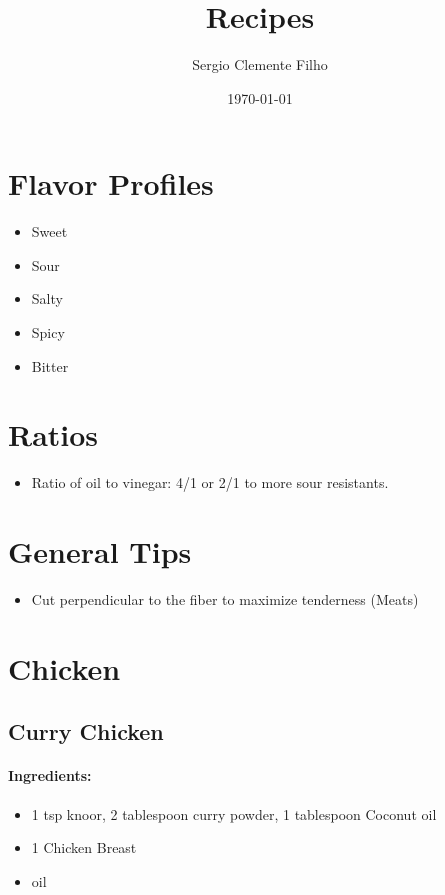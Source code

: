 \documentclass{article}
\title{Recipes}
\author{Sergio Clemente Filho}
\date{\today}
\begin{document}
\maketitle

\newpage

\tableofcontents{}

\newpage

\section{Flavor Profiles}
\begin{itemize}
	\item Sweet
	\item Sour
	\item Salty
	\item Spicy
	\item Bitter
\end{itemize}

	\section{Ratios}
\begin{itemize}
	\item Ratio of oil to vinegar: 4/1 or 2/1 to more sour resistants.
\end{itemize}

\section{General Tips}
\begin{itemize}
	\item Cut perpendicular to the fiber to maximize tenderness (Meats)
\end{itemize}






\section{Chicken}


\subsection{Curry Chicken}

\paragraph{Ingredients:}
\begin{itemize}
    \item 1 tsp knoor, 2 tablespoon curry powder, 1 tablespoon Coconut oil
    \item 1 Chicken Breast
    \item oil
\end{itemize}
\end{document}
